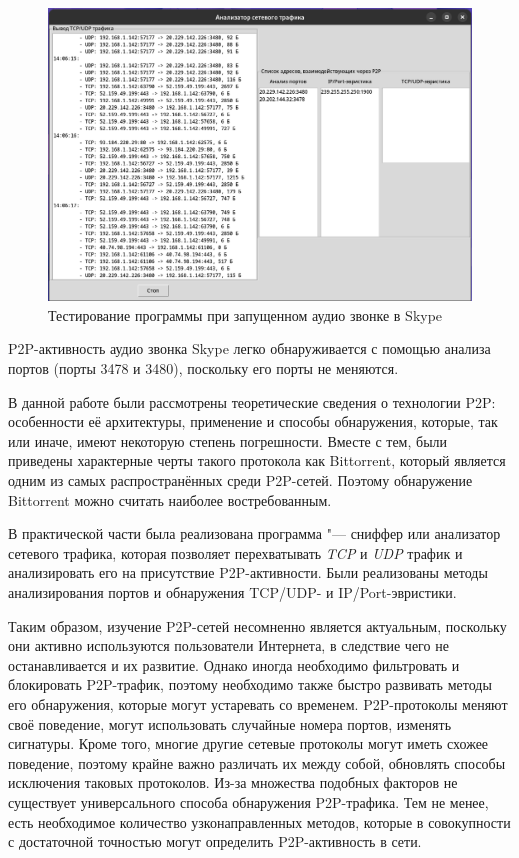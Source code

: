 \documentclass[bachelor, och, coursework]{SCWorks}
\begin{document}
\begin{figure}[H]
    \centering
    \includegraphics[width=0.999\textwidth]{test4.png}
    \caption{Тестирование программы при запущенном аудио звонке в Skype}
    \label{test4}
\end{figure}

P2P-активность аудио звонка Skype легко обнаруживается с помощью анализа портов (порты 3478 и 3480), поскольку его порты не меняются.

\conclusion
В данной работе были рассмотрены теоретические сведения о технологии P2P: особенности её архитектуры, применение
и способы обнаружения, которые, так или иначе, имеют некоторую степень погрешности. Вместе с тем, были приведены характерные черты такого протокола как Bittorrent, который является одним из самых распространённых среди P2P-сетей.
Поэтому обнаружение Bittorrent можно считать наиболее востребованным.

В практической части была реализована программа "--- сниффер или анализатор сетевого трафика, которая позволяет
перехватывать \textit{TCP} и \textit{UDP} трафик и анализировать его на присутствие P2P-активности. Были реализованы методы анализирования портов и обнаружения TCP/UDP- и IP/Port-эвристики.

Таким образом, изучение P2P-сетей несомненно является актуальным, поскольку они активно используются пользователи Интернета, в следствие чего не останавливается и их развитие. Однако иногда необходимо фильтровать и блокировать P2P-трафик, поэтому необходимо также быстро развивать методы его обнаружения, которые могут устаревать со временем. P2P-протоколы меняют своё поведение, могут использовать случайные номера портов, изменять сигнатуры. Кроме того, многие другие сетевые протоколы могут иметь схожее поведение, поэтому крайне важно различать их между собой, обновлять способы исключения таковых протоколов. Из-за множества подобных факторов не существует универсального способа обнаружения P2P-трафика. Тем не менее, есть необходимое количество узконаправленных методов, которые в совокупности с достаточной 
точностью могут определить P2P-активность в сети.
\end{document}
